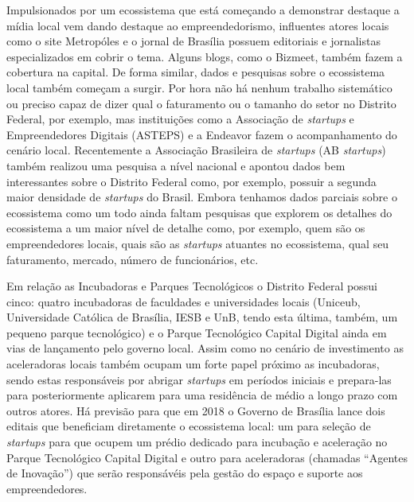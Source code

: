 Impulsionados por um ecossistema que está começando a demonstrar destaque a mídia local vem dando destaque ao empreendedorismo, influentes atores locais como o site Metropóles e o jornal de Brasília possuem editoriais e jornalistas especializados em cobrir o tema. Alguns blogs, como o Bizmeet, também fazem a cobertura na capital. De forma similar, dados e pesquisas sobre o ecossistema local também começam a surgir. Por hora não há nenhum trabalho sistemático ou preciso capaz de dizer qual o faturamento ou o tamanho do setor no Distrito Federal, por exemplo, mas instituições como a Associação de \textit{startups} e Empreendedores Digitais (ASTEPS) e a Endeavor fazem o acompanhamento do cenário local. Recentemente a Associação Brasileira de \textit{startups} (AB \textit{startups}) também realizou uma pesquisa a nível nacional e apontou dados bem interessantes sobre o Distrito Federal como, por exemplo, possuir a segunda maior densidade de \textit{startups} do Brasil. Embora tenhamos dados parciais sobre o ecossistema como um todo ainda faltam pesquisas que explorem os detalhes do ecossistema a um maior nível de detalhe como, por exemplo, quem são os empreendedores locais, quais são as \textit{startups} atuantes no ecossistema, qual seu faturamento, mercado, número de funcionários, etc.

Em relação as Incubadoras e Parques Tecnológicos o Distrito Federal possui cinco: quatro incubadoras de faculdades e universidades locais (Uniceub, Universidade Católica de Brasília, IESB e UnB, tendo esta última, também, um pequeno parque tecnológico) e o Parque Tecnológico Capital Digital ainda em vias de lançamento pelo governo local. Assim como no cenário de investimento as aceleradoras locais também ocupam um forte papel próximo as incubadoras, sendo estas responsáveis por abrigar \textit{startups} em períodos iniciais e prepara-las para posteriormente aplicarem para uma residência de médio a longo prazo com outros atores. Há previsão para que em 2018 o Governo de Brasília lance dois editais que beneficiam diretamente o ecossistema local: um para seleção de \textit{startups} para que ocupem um prédio dedicado para incubação e aceleração no Parque Tecnológico Capital Digital e outro para aceleradoras (chamadas ``Agentes de Inovação'') que serão responsávéis pela gestão do espaço e suporte aos empreendedores.

